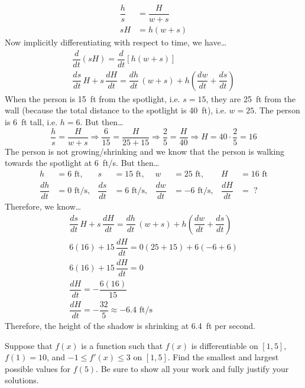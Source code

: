 \documentclass[12pt,letterpaper]{exam}
\begin{document}
\begin{questions}
{	\[
	\begin{aligned}
	\dfrac{h}{s}&= \dfrac{H}{w + s} \\[0.3cm]
	sH&= h(w + s)
	\end{aligned}
	\]
Now implicitly differentiating with respect to time, we have\dots
	\[
	\begin{gathered}
	\dfrac{d}{dt} (sH)= \dfrac{d}{dt} \left[ h(w + s) \right] \\[0.3cm]
	\dfrac{ds}{dt} \,H + s \, \dfrac{dH}{dt}= \dfrac{dh}{dt} \,(w + s) + h \left( \dfrac{dw}{dt} + \dfrac{ds}{dt} \right)
	\end{gathered}
	\]
When the person is 15~ft from the spotlight, i.e. $s= 15$, they are 25~ft from the wall (because the total distance to the spotlight is 40~ft), i.e. $w= 25$. The person is 6~ft tall, i.e. $h= 6$. But then\dots
	\[
	\dfrac{h}{s}= \dfrac{H}{w + s} \Longrightarrow \dfrac{6}{15}= \dfrac{H}{25 + 15} \Longrightarrow \dfrac{2}{5}= \dfrac{H}{40} \Longrightarrow H= 40 \cdot \dfrac{2}{5}= 16
	\]
The person is not growing/shrinking and we know that the person is walking towards the spotlight at 6~ft/s. But then\dots
	\[
	\begin{aligned}
	h&= 6 \text{ ft}, & s&= 15 \text{ ft}, & w&= 25 \text{ ft}, & H&= 16 \text{ ft} \\
	\dfrac{dh}{dt}&= 0 \text{ ft/s}, & \dfrac{ds}{dt}&= 6 \text{ ft/s}, & \dfrac{dw}{dt}&= -6 \text{ ft/s}, & \dfrac{dH}{dt}&= \,\, ?
	\end{aligned}
	\]
Therefore, we know\dots
	\[
	\begin{gathered}
	\dfrac{ds}{dt} \,H + s \, \dfrac{dH}{dt}= \dfrac{dh}{dt} \,(w + s) + h \left( \dfrac{dw}{dt} + \dfrac{ds}{dt} \right) \\[0.3cm]
	6(16) + 15 \, \dfrac{dH}{dt}= 0 (25 + 15) + 6 \left( -6 + 6 \right) \\[0.3cm]
	6(16) + 15 \, \dfrac{dH}{dt}= 0 \\
	\dfrac{dH}{dt}= -\dfrac{6(16)}{15} \\
	\dfrac{dH}{dt}= -\dfrac{32}{5} \approx -6.4 \text{ ft/s}
	\end{gathered}
	\]
Therefore, the height of the shadow is shrinking at 6.4~ft per second.
}



\newpage
\question[10] Suppose that $f(x)$ is a function such that $f(x)$ is differentiable on $[1, 5]$, $f(1)= 10$, and $-1 \leq f'(x) \leq 3$ on $[1, 5]$. Find the smallest and largest possible values for $f(5)$. Be sure to show all your work and fully justify your solutions. \par\vspace{1cm}


\end{questions}
\end{document}
